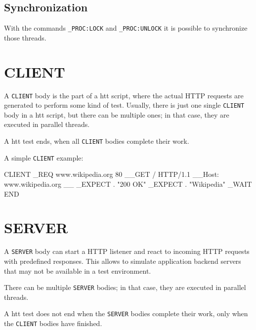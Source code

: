 \subsection{Synchronization}
With the commands \texttt{\_PROC:LOCK} and \texttt{\_PROC:UNLOCK} it is possible to
synchronize those threads. 



\newpage
\section{CLIENT}
\label{chap:client}

A \texttt{CLIENT} body is the part of a htt script, where the actual HTTP requests 
are generated to perform some kind of test. Usually, there is just one single 
\texttt{CLIENT} body in a htt script, but there can be multiple ones; in that case, 
they are executed in parallel threads.

A htt test ends, when all \texttt{CLIENT} bodies complete their work.

A simple \texttt{CLIENT} example:

\begin{usplisting}
    CLIENT
    _REQ www.wikipedia.org 80
    __GET / HTTP/1.1
    __Host: www.wikipedia.org
    __
    _EXPECT . "200 OK"
    _EXPECT . "Wikipedia"
    _WAIT
    END
\end{usplisting}



\newpage
\section{SERVER}
\label{chap:server}

A \texttt{SERVER} body can start a HTTP listener and react to incoming HTTP 
requests with predefined responses. This allows to simulate application 
backend servers that may not be available in a test environment. 

There can be multiple \texttt{SERVER} bodies; in that case, 
they are executed in parallel threads.

A htt test does not end when the \texttt{SERVER} bodies complete their work, 
only when the \texttt{CLIENT} bodies have finished.

